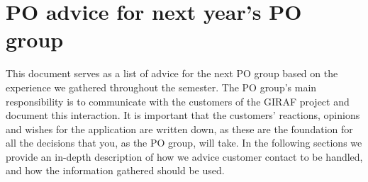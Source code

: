 \section{PO advice for next year's PO group} \label{appendix:PO-advice}

This document serves as a list of advice for the next PO group based on the experience we gathered throughout the semester.
The PO group's main responsibility is to communicate with the customers of the GIRAF project and document this interaction.
It is important that the customers' reactions, opinions and wishes for the application are written down, as these are the foundation for all the decisions that you, as the PO group, will take.
In the following sections we provide an in-depth description of how we advice customer contact to be handled, and how the information gathered should be used.

